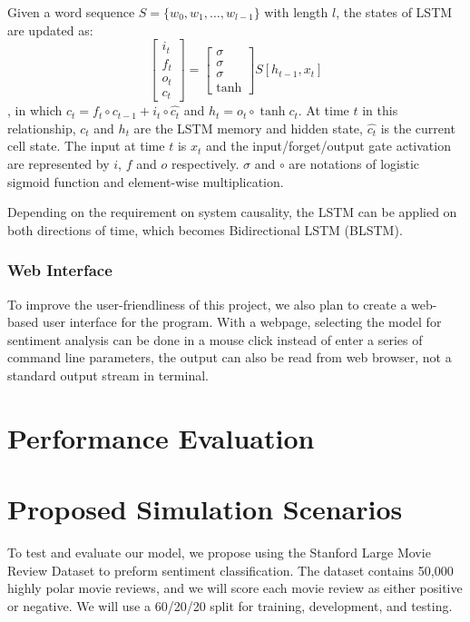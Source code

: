 \documentclass[conference]{IEEEtran}
\begin{document}
    Given a word sequence $S=\{w_0,w_1,\ldots,w_{l-1}\}$ with length $l$, the states
    of LSTM are updated as:
    $$
    \begin{bmatrix} 
    i_t\\f_t\\o_t\\c_t 
    \end{bmatrix} = 
    \begin{bmatrix}
    \sigma\\\sigma\\\sigma\\\tanh
    \end{bmatrix}
    S[h_{t-1},x_t]
    $$
    , in which $c_t=f_t\circ c_{t-1} + i_t\circ\hat{c_t}$ and $h_t=o_t\circ\tanh{c_t}$.
    At time $t$ in this relationship, $c_t$ and $h_t$ are the LSTM memory and 
    hidden state, $\hat{c_t}$ is the current cell state. The input at time $t$ 
    is $x_t$ and the input/forget/output gate activation are represented by $i$, 
    $f$ and $o$ respectively. $\sigma$ and $\circ$ are notations of logistic 
    sigmoid function and element-wise multiplication\cite{zhou2016text}.
    
    Depending on the requirement on system causality, the LSTM can be applied on
    both directions of time, which becomes Bidirectional LSTM 
    (BLSTM)\cite{schuster1997bidirectional,barnes2017assessing}.

\subsubsection{Web Interface}
\label{model:stretch:web}
    To improve the user-friendliness of this project, we also plan to create a 
    web-based user interface for the program. With a webpage, selecting
    the model for sentiment analysis can be done in a mouse click instead of 
    enter a series of command line parameters, the output can also
    be read from web browser, not a standard output stream in terminal. 

\section{Performance Evaluation}
\label{performance}


\section{Proposed Simulation Scenarios}
\label{scenarios}
    To test and evaluate our model, we propose using the Stanford Large Movie Review
    Dataset to preform sentiment classification\cite{maas2011learning}.
    The dataset contains 50,000 highly polar
    movie reviews, and we will score each movie review as either positive or
    negative. We will use a 60/20/20 split for training, development, and testing.
\end{document}
